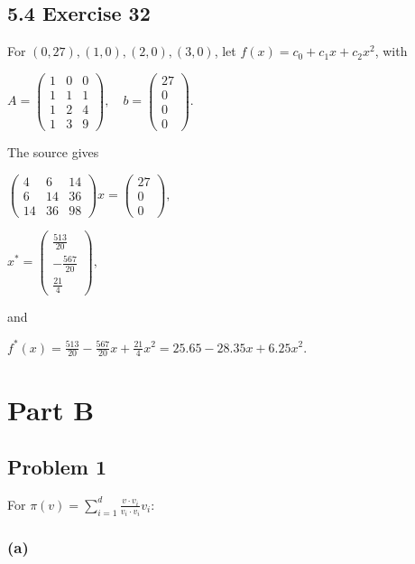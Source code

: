 \section{5.4 Exercise 32}

For \(\left( {0,27} \right),\left( {1,0} \right),\left( {2,0} \right),\left( {3,0} \right)\), let \(f(x) = c_{0} + c_{1}x + c_{2}x^{2}\), with

\(A = \begin{pmatrix}
1 & 0 & 0 \\
1 & 1 & 1 \\
1 & 2 & 4 \\
1 & 3 & 9
\end{pmatrix},\quad b = \begin{pmatrix}
27 \\
0 \\
0 \\
0
\end{pmatrix}.\)

The source gives

\(\begin{pmatrix}
4 & 6 & 14 \\
6 & 14 & 36 \\
14 & 36 & 98
\end{pmatrix}x = \begin{pmatrix}
27 \\
0 \\
0
\end{pmatrix},\)

\(x^{\ast} = \begin{pmatrix}
\frac{513}{20} \\
{- \frac{567}{20}} \\
\frac{21}{4}
\end{pmatrix},\)

and

\(f^{\ast}(x) = \frac{513}{20} - \frac{567}{20}x + \frac{21}{4}x^{2} = 25.65 - 28.35x + 6.25x^{2}.\)

\chapter{Part B}

\section{Problem 1}

For \(\pi(v) = \sum_{i = 1}^{d}\frac{v \cdot v_{i}}{v_{i} \cdot v_{i}}v_{i}\):

\subsection{(a)}

